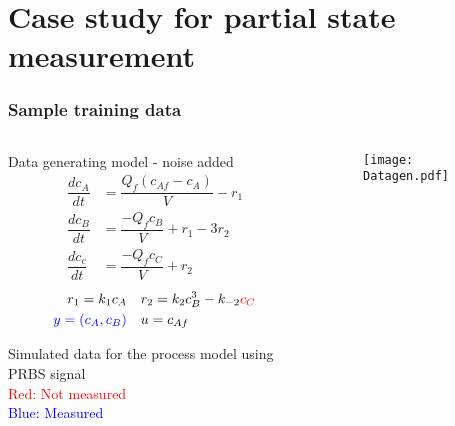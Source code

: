 \documentclass[dvipsnames, 9pt]{beamer}
\begin{document}
\section{Case study for partial state measurement}
\begin{frame}
    \frametitle{Sample training data}
    
    \begin{columns}
    {   \begin{column}{0.37\textwidth}
        \begin{block}{Data generating model - noise added}
\begin{align*}
\dfrac{dc_A}{dt} &= \dfrac{Q_f (c_{Af} - c_A)}{V} - r_1 \\
\dfrac{dc_B}{dt} &= \dfrac{-Q_f c_B}{V} + r_1 - 3r_2 \\
\dfrac{dc_c}{dt} &= \dfrac{-Q_f c_C}{V} + r_2 
\end{align*}
\begin{align*}
r_1 = k_1 c_A &\quad r_2 = k_2 c_B^3 - k_{-2} \textcolor{red}{c_C} \\
\textcolor{blue}{y = (c_A, c_B)} &\quad u = c_{Af}
\end{align*}
\end{block}
Simulated data for the process model using PRBS signal\\ 
\scriptsize{\textcolor{red}{Red: Not measured}\\
\textcolor{blue}{Blue: Measured}}
        \end{column}}
        \begin{column}{0.63\textwidth}
            \begin{figure}
\texttt{[image: Datagen.pdf]}
 \end{figure}
        \end{column}
    \end{columns}
\end{frame}
\end{document}
